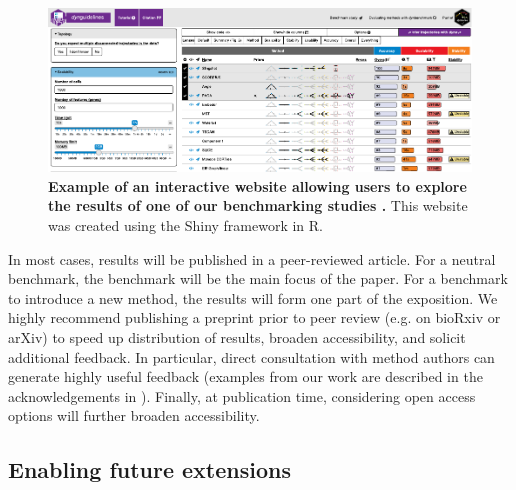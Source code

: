 \begin{figure}[htb!]
	\centering
	\includegraphics[width=\textwidth]{fig/essential_guidelines_figure3} 
	\caption{\textbf{Example of an interactive website allowing users to explore the results of one of our benchmarking studies \cite{saelens_comparisonsinglecelltrajectory_2019}.} This website was created using the Shiny framework in R.}
	\label{fig:fig3_interactive}
\end{figure}

In most cases, results will be published in a peer-reviewed article. For a neutral benchmark, the benchmark will be the main focus of the paper. For a benchmark to introduce a new method, the results will form one part of the exposition. We highly recommend publishing a preprint prior to peer review (e.g. on bioRxiv or arXiv) to speed up distribution of results, broaden accessibility, and solicit additional feedback. In particular, direct consultation with method authors can generate highly useful feedback (examples from our work are described in the acknowledgements in \cite{lindgreen_evaluationaccuracyspeed_2016,freyhult_exploringgenomicdark_2007}). Finally, at publication time, considering open access options will further broaden accessibility.

\subsection{Enabling future extensions}

